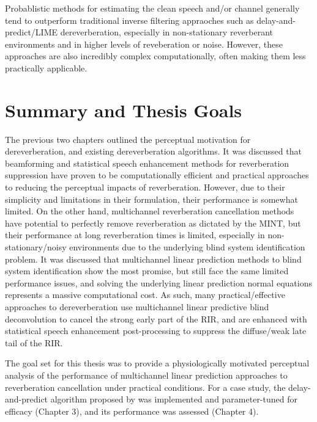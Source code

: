 Probablistic methods for estimating the clean speech and/or channel generally tend to outperform traditional inverse filtering appraoches such as delay-and-predict/LIME dereverberation, especially in non-stationary reverberant environments and in higher levels of reveberation or noise. However, these approaches are also incredibly complex computationally, often making them less practically applicable.

\section{Summary and Thesis Goals}

The previous two chapters outlined the perceptual motivation for dereverberation, and existing dereverberation algorithms. It was discussed that beamforming and statistical speech enhancement methods for reverberation suppression have proven to be computationally efficient and practical approaches to reducing the perceptual impacts of reverberation. However, due to their simplicity and limitations in their formulation, their performance is somewhat limited. On the other hand, multichannel reverberation cancellation methods have potential to perfectly remove reverberation as dictated by the MINT, but their performance at long reverberation times is limited, especially in non-stationary/noisy environments due to the underlying blind system identification problem. It was discussed that multichannel linear prediction methods to blind system identification show the most promise, but still face the same limited performance issues, and solving the underlying linear prediction normal equations represents a massive computational cost. As such, many practical/effective approaches to dereverberation use multichannel linear predictive blind deconvolution to cancel the strong early part of the RIR, and are enhanced with statistical speech enhancement post-processing to suppress the diffuse/weak late tail of the RIR.

The goal set for this thesis was to provide a physiologically motivated perceptual analysis of the performance of multichannel linear prediction approaches to reverberation cancellation under practical conditions. For a case study, the delay-and-predict algorithm proposed by \cite{triki2006delay} was implemented and parameter-tuned for efficacy (Chapter 3), and its performance was assessed (Chapter 4). 